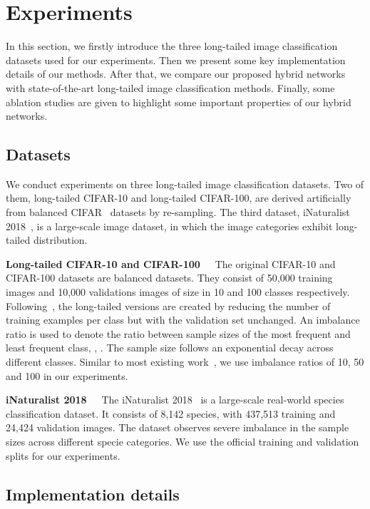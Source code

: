 \documentclass[final]{cvpr}
\begin{document}
\section{Experiments}

In this section, we firstly introduce the three long-tailed image classification datasets used for our experiments. Then we present some key implementation details of our methods. After that, we compare our proposed hybrid networks with state-of-the-art long-tailed image classification methods. Finally, some ablation studies are given
to highlight some important properties of our hybrid networks. 

\subsection{Datasets}
We conduct experiments on three long-tailed image classification datasets. Two of them, long-tailed CIFAR-10 and long-tailed CIFAR-100, are derived artificially from balanced CIFAR~\cite{cifar} datasets by re-sampling. The third dataset, iNaturalist 2018~\cite{inat2017}, is a large-scale image dataset, in which the image categories exhibit long-tailed distribution.

\par{\textbf{Long-tailed CIFAR-10 and CIFAR-100~~}} The original CIFAR-10 and CIFAR-100 datasets are balanced datasets. They consist of 50,000 training images and 10,000 validations images of size  in 10 and 100 classes respectively. Following~\cite{effnumber,cao2019learning}, the long-tailed versions are created by reducing the number of training examples per class but with the validation set unchanged. An imbalance ratio  is used to denote the ratio between sample sizes of the most frequent and least frequent class, \ie, . The sample size follows an exponential decay across different classes. Similar to most existing work~\cite{effnumber,cao2019learning,BBN}, we use imbalance ratios of 10, 50 and 100 in our experiments.
\par{\textbf{iNaturalist 2018~~}} The iNaturalist 2018~\cite{inat2017} is a large-scale real-world species classification dataset. It consists of 8,142 species, with 437,513 training and 24,424 validation images. The dataset observes severe imbalance in the sample sizes across different specie categories. We use the official training and validation splits for our experiments. 

\subsection{Implementation details}
\end{document}
